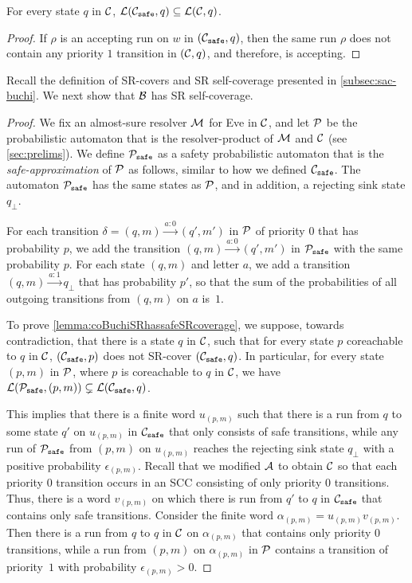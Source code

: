 \begin{proposition}\label{prop:safe-cobuchi-langcomparison}
    For every state $q$ in $\mathcal{C}$, $\mathcal{L}(\mathcal{C}_{\texttt{safe}},q)\subseteq \mathcal{L}(\mathcal{C},q)$.
\end{proposition}
\begin{proof}
    If $\rho$ is an accepting run on $w$ in $(\mathcal{C}_{\texttt{safe}},q)$, then the same run $\rho$ does not contain any priority $1$ transition in $(\mathcal{C},q)$, and therefore, is accepting.
\end{proof}

Recall the definition of SR-covers and SR self-coverage presented in \cref{subsec:sac-buchi}. We next show that $\mathcal{B}$ has SR self-coverage.
\lemmaSRhassafeSRcoverage*
\begin{proof}
We fix an almost-sure resolver $\mathcal{M}$ for Eve in $\mathcal{C}$,  and let $\mathcal{P}$ be the probabilistic automaton that is the resolver-product of $\mathcal{M}$ and $\mathcal{C}$ (see \cref{sec:prelims}). We define $\mathcal{P}_{\texttt{safe}}$ as a safety probabilistic automaton that is the \emph{safe-approximation} of $\mathcal{P}$ as follows, similar to how we defined $\mathcal{C}_{\texttt{safe}}$. 
The automaton $\mathcal{P}_{\texttt{safe}}$ has the same states as $\mathcal{P}$, and in addition, a rejecting sink state $q_{\bot}$. 

For each transition $\delta=(q,m)\xrightarrow{a:0}(q',m')$ in $\mathcal{P}$ of priority $0$ that has probability $p$, we add the transition $(q,m)\xrightarrow{a:0} (q',m')$ in $\mathcal{P}_{\texttt{safe}}$ with the same probability $p$. For each state $(q,m)$ and letter $a$, we add a transition $(q,m)\xrightarrow{a:1}q_{\bot}$ that has probability $p'$, so that the sum of  the probabilities of all outgoing transitions from $(q,m)$ on $a$ is~$1$.

To prove \cref{lemma:coBuchiSRhassafeSRcoverage}, we suppose, towards contradiction, that
there is a state $q$ in $\mathcal{C}$, such that for every state $p$ coreachable to $q$ in $\mathcal{C}$, $(\mathcal{C}_{\texttt{safe}},p)$ does not SR-cover $(\mathcal{C}_{\texttt{safe}},q)$. In particular, for every state $(p,m)$ in $\mathcal{P}$, where $p$ is coreachable to $q$ in $\mathcal{C}$, we have $\mathcal{L}(\mathcal{P}_{\texttt{safe}},(p,m)) \subsetneq \mathcal{L}(\mathcal{C}_{\texttt{safe}},q)$. 

This implies that there is a finite word $u_{(p,m)}$ such that there is a run from $q$ to some state $q'$ on $u_{(p,m)}$ in $\mathcal{C}_{\texttt{safe}}$ that only consists of safe transitions, while any run of $\mathcal{P}_{\texttt{safe}}$ from $(p,m)$ on $u_{(p,m)}$ reaches the rejecting sink state $q_{\bot}$ with a positive probability $\epsilon_{(p,m)}$. Recall that we modified $\mathcal{A}$ to obtain $\mathcal{C}$ so that each priority $0$ transition occurs in an SCC consisting of only priority $0$ transitions. Thus, there is a word $v_{(p,m)}$ on which there is run from $q'$ to $q$ in $\mathcal{C}_{\texttt{safe}}$ that contains only safe transitions. Consider the finite word $\alpha_{(p,m)}=u_{(p,m)} v_{(p,m)}$. Then there is a run from $q$ to $q$ in $\mathcal{C}$ on $\alpha_{(p,m)}$ that contains only priority $0$ transitions, while a run from $(p,m)$ on $\alpha_{(p,m)}$ in $\mathcal{P}$ contains a transition of priority~$1$ with probability $\epsilon_{(p,m)}>0$. 


\end{proof}
